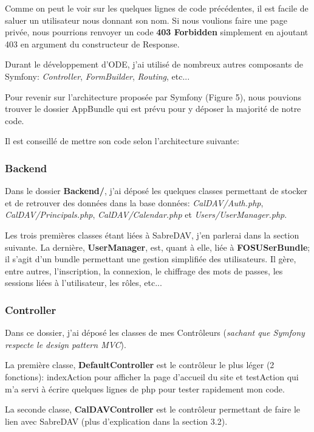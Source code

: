 Comme on peut le voir sur les quelques lignes de code précédentes, il est facile de saluer un utilisateur nous donnant son nom. Si nous voulions faire une page privée, nous pourrions renvoyer un code \textbf{403 Forbidden} simplement en ajoutant 403 en argument du constructeur de Response.

Durant le développement d'ODE, j'ai utilisé de nombreux autres composants de Symfony: \textit{Controller}, \textit{FormBuilder}, \textit{Routing}, etc...

\vspace{1cm}

Pour revenir sur l'architecture proposée par Symfony (Figure 5), nous pouvions trouver le dossier AppBundle qui est prévu pour y déposer la majorité de notre code.

Il est conseillé de mettre son code selon l'architecture suivante:

\subsubsection*{Backend}

Dans le dossier \textbf{Backend/}, j'ai déposé les quelques classes permettant de stocker et de retrouver des données dans la base données: \textit{CalDAV/Auth.php}, \textit{CalDAV/Principals.php}, \textit{CalDAV/Calendar.php} et \textit{Users/UserManager.php}.

Les trois premières classes étant liées à SabreDAV, j'en parlerai dans la section suivante. La dernière, \textbf{UserManager}, est, quant à elle, liée à \textbf{FOSUSerBundle}; il s'agit d'un bundle permettant une gestion simplifiée des utilisateurs. Il gère, entre autres, l'inscription, la connexion, le chiffrage des mots de passes, les sessions liées à l'utilisateur, les rôles, etc...

\subsubsection*{Controller}

Dans ce dossier, j'ai déposé les classes de mes Contrôleurs (\textit{sachant que Symfony respecte le design pattern MVC}).

La première classe, \textbf{DefaultController} est le contrôleur le plus léger (2 fonctions): indexAction pour afficher la page d'accueil du site et testAction qui m'a servi à écrire quelques lignes de php pour tester rapidement mon code.

La seconde classe, \textbf{CalDAVController} est le contrôleur permettant de faire le lien avec SabreDAV (plus d'explication dans la section 3.2).

